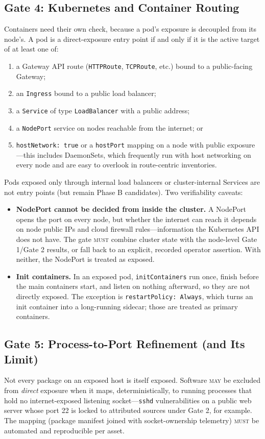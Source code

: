 \documentclass[11pt]{article}
\newcommand{\code}[1]{\texttt{#1}}
\newcommand{\rfckw}[1]{\textsc{#1}}
\begin{document}
\subsection{Gate 4: Kubernetes and Container Routing}
Containers need their own check, because a pod's exposure is decoupled from its node's. A pod is a direct-exposure entry point if and only if it is the active target of at least one of:
\begin{enumerate}[label=(\alph*), leftmargin=2.5em, nosep]
\item a Gateway API route (\code{HTTPRoute}, \code{TCPRoute}, etc.) bound to a public-facing Gateway;
\item an \code{Ingress} bound to a public load balancer;
\item a \code{Service} of type \code{LoadBalancer} with a public address;
\item a \code{NodePort} service on nodes reachable from the internet; or
\item \code{hostNetwork:\ true} or a \code{hostPort} mapping on a node with public exposure---this includes DaemonSets, which frequently run with host networking on every node and are easy to overlook in route-centric inventories.
\end{enumerate}
Pods exposed only through internal load balancers or cluster-internal Services are not entry points (but remain Phase B candidates). Two verifiability caveats:
\begin{itemize}[leftmargin=1.5em, nosep]
\item \textbf{NodePort cannot be decided from inside the cluster.} A NodePort opens the port on every node, but whether the internet can reach it depends on node public IPs and cloud firewall rules---information the Kubernetes API does not have. The gate \rfckw{must} combine cluster state with the node-level Gate 1/Gate 2 results, or fall back to an explicit, recorded operator assertion. With neither, the NodePort is treated as exposed.
\item \textbf{Init containers.} In an exposed pod, \code{initContainers} run once, finish before the main containers start, and listen on nothing afterward, so they are not directly exposed. The exception is \code{restartPolicy:\ Always}, which turns an init container into a long-running sidecar; those are treated as primary containers.
\end{itemize}

\subsection{Gate 5: Process-to-Port Refinement (and Its Limit)}
Not every package on an exposed host is itself exposed. Software \rfckw{may} be excluded from \emph{direct} exposure when it maps, deterministically, to running processes that hold no internet-exposed listening socket---\code{sshd} vulnerabilities on a public web server whose port 22 is locked to attributed sources under Gate 2, for example. The mapping (package manifest joined with socket-ownership telemetry) \rfckw{must} be automated and reproducible per asset.
\end{document}
